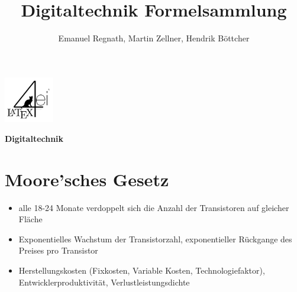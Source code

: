 \documentclass[6pt,a4paper]{scrartcl}
\title{Digitaltechnik Formelsammlung}
\author{Emanuel Regnath, Martin Zellner, Hendrik Böttcher}
\renewcommand{\emph}[1]{\textsf{\textbf{#1}}}
\begin{document}
\begin{multicols*}{3}

\parbox{2.3cm}{
	\includegraphics[height=2cm]{./img/Logo.pdf}
}
\parbox{4cm}{
	\emph{\huge{Digitaltechnik}}
}

\section{Moore'sches Gesetz}
\begin{itemize} \itemsep0pt
	\item alle 18-24 Monate verdoppelt sich die Anzahl der Transistoren auf gleicher Fläche
	\item Exponentielles Wachstum der Transistorzahl, exponentieller Rückgange des Preises pro Transistor
	\item Herstellungskosten (Fixkosten, Variable Kosten, Technologiefaktor), Entwicklerproduktivität, Verlustleistungsdichte
\end{itemize}


\end{multicols*}
\end{document}
